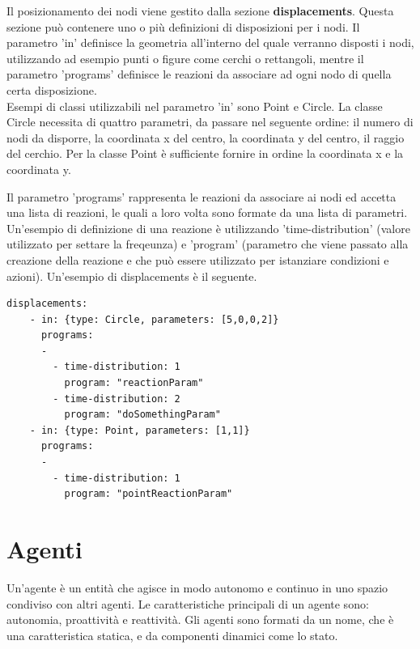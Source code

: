 \documentclass[12pt,a4paper,openright,twoside]{report}
\begin{document}
Il posizionamento dei nodi viene gestito dalla sezione \textbf{displacements}. Questa sezione pu\`o contenere uno o pi\`u definizioni di disposizioni per i nodi.
Il parametro 'in' definisce la geometria all'interno del quale verranno disposti i nodi, utilizzando ad esempio punti o figure come cerchi o rettangoli, mentre il parametro 'programs' definisce le reazioni da associare ad ogni nodo di quella certa disposizione.
\\
Esempi di classi utilizzabili nel parametro 'in' sono Point e Circle.
La classe Circle necessita di quattro parametri, da passare nel seguente ordine: il numero di nodi da disporre, la coordinata x del centro, la coordinata y del centro, il raggio del cerchio. Per la classe Point \`e sufficiente fornire in ordine la coordinata x e la coordinata y.

Il parametro 'programs' rappresenta le reazioni da associare ai nodi ed accetta una lista di reazioni, le quali a loro volta sono formate da una lista di parametri. Un'esempio di definizione di una reazione \`e utilizzando 'time-distribution' (valore utilizzato per settare la freqeunza) e 'program' (parametro che viene passato alla creazione della reazione e che pu\`o essere utilizzato per istanziare condizioni e azioni).
Un'esempio di displacements \`e il seguente.
\medskip
\begin{lstlisting}[firstnumber=last,caption={Disposizione nodi e reazioni associate}]
  displacements:
    - in: {type: Circle, parameters: [5,0,0,2]}
      programs:
      -
        - time-distribution: 1
          program: "reactionParam"
        - time-distribution: 2
          program: "doSomethingParam"
    - in: {type: Point, parameters: [1,1]}
      programs:
      -
        - time-distribution: 1
          program: "pointReactionParam"
\end{lstlisting}


\chapter{Agenti}
\lhead[\fancyplain{}{\bfseries\thepage}]{\fancyplain{}{\bfseries\rightmark}}

Un'agente \`e un entit\`a che agisce in modo autonomo e continuo in uno spazio condiviso con altri agenti. Le caratteristiche principali di un agente sono: autonomia, proattivit\`a e reattivit\`a. Gli agenti sono formati da un nome, che \`e una caratteristica statica, e da componenti dinamici come lo stato.
\end{document}
